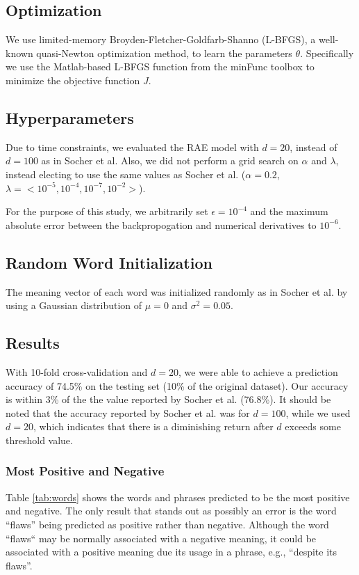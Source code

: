 \documentclass{article}
\begin{document}
%
%
\subsection{Optimization}
We use limited-memory Broyden-Fletcher-Goldfarb-Shanno (L-BFGS), a well-known quasi-Newton optimization method, to learn the parameters $\theta$. Specifically we use the Matlab-based L-BFGS function from the minFunc toolbox \cite{minFunc} to minimize the objective function $J$.


%
%
\subsection{Hyperparameters}
Due to time constraints, we evaluated the RAE model with $d=20$, instead of $d=100$ as in Socher et al. Also, we did not perform a grid search on $\alpha$ and $\lambda$, instead electing to use the same values as Socher et al. ($\alpha = 0.2$, $\lambda = <10^{-5}, 10^{-4}, 10^{-7}, 10^{-2}>$).

For the purpose of this study, we arbitrarily set $\epsilon = 10^{-4}$ and the maximum absolute error between the backpropogation and numerical derivatives to $10^{-6}$. 


%
%
\subsection{Random Word Initialization}
The meaning vector of each word was initialized randomly as in Socher et al. by using a Gaussian distribution of $\mu = 0$ and $\sigma ^2 = 0.05$.


%
%
\subsection{Results}
With 10-fold cross-validation and $d=20$, we were able to achieve a prediction accuracy of 74.5\% on the testing set (10\% of the original dataset). Our accuracy is within 3\% of the the value reported by Socher et al. (76.8\%). It should be noted that the accuracy reported by Socher et al. was for $d=100$, while we used $d=20$, which indicates that there is a diminishing return after $d$ exceeds some threshold value.


\subsubsection{Most Positive and Negative}
Table \ref{tab:words} shows the words and phrases predicted to be the most positive and negative. The only result that stands out as possibly an error is the word ``flaws'' being predicted as positive rather than negative. Although the word ``flaws`` may be normally associated with a negative meaning, it could be associated with a positive meaning due its usage in a phrase, e.g., ``despite its flaws''.
\end{document}
